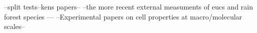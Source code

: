 --split tests--kens papers--
--the more recent external measuments of eucs and rain forest species ---
--Experimental papers on cell properties at macro/molecular scales--